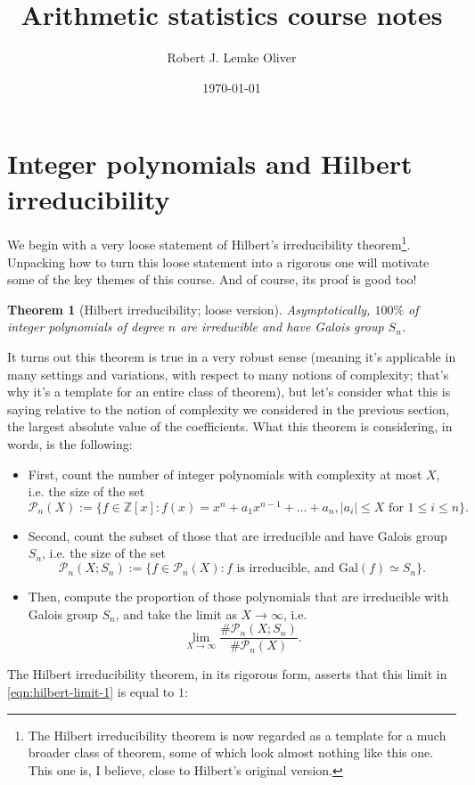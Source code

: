 \documentclass[12pt]{amsart}
\title{Arithmetic statistics course notes}
\author{Robert J. Lemke Oliver}
\date{\today}
\newtheorem{theorem}{Theorem}
\theoremstyle{definition} \newtheorem*{notation}{Notation}
\theoremstyle{remark} \newtheorem*{remark}{Remark}
\theoremstyle{remark} \newtheorem*{example}{Example}
\theoremstyle{definition} \newtheorem*{definition}{Definition}
\numberwithin{equation}{section}
\numberwithin{theorem}{section}
\begin{document}
	\maketitle
	
	\setcounter{section}{0}
	
\section{Integer polynomials and Hilbert irreducibility}
	
	We begin with a very loose statement of Hilbert's irreducibility theorem\footnote{The Hilbert irreducibility theorem is now regarded as a template for a much broader class of theorem, some of which look almost nothing like this one.  This one is, I believe, close to Hilbert's original version.}.  Unpacking how to turn this loose statement into a rigorous one will motivate some of the key themes of this course.  And of course, its proof is good too!
	
	\begin{theorem}[Hilbert irreducibility; loose version]
		Asymptotically, $100\%$ of integer polynomials of degree $n$ are irreducible and have Galois group $S_n$.
	\end{theorem}
	
	It turns out this theorem is true in a very robust sense (meaning it's applicable in many settings and variations, with respect to many notions of complexity; that's why it's a template for an entire class of theorem), but let's consider what this is saying relative to the notion of complexity we considered in the previous section, the largest absolute value of the coefficients.  What this theorem is considering, in words, is the following:
		\begin{itemize}
			\item First, count the number of integer polynomials with complexity at most $X$, i.e. the size of the set 
				\[
					\mathcal{P}_n(X):=\{f \in \mathbb{Z}[x] : f(x) = x^n + a_1x^{n-1} + \dots + a_n, |a_i| \leq X \text{ for } 1\leq i \leq n\}.
				\]
			\item Second, count the subset of those that are irreducible and have Galois group $S_n$, i.e. the size of the set
				\[
					\mathcal{P}_n(X;S_n) := \{f \in \mathcal{P}_n(X) : f \text{ is irreducible, and } \mathrm{Gal}(f) \simeq S_n\}.
				\]
			\item Then, compute the proportion of those polynomials that are irreducible with Galois group $S_n$, and take the limit as $X\to \infty$, i.e.
				\begin{equation}\label{eqn:hilbert-limit-1}
					\lim_{X \to \infty} \frac{\#\mathcal{P}_n(X;S_n)}{\#\mathcal{P}_n(X)}.
				\end{equation}
		\end{itemize}
	The Hilbert irreducibility theorem, in its rigorous form, asserts that this limit in \eqref{eqn:hilbert-limit-1} is equal to $1$:
	
\end{document}
